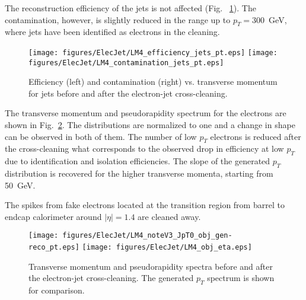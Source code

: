 \documentclass{cmspaper}
\begin{document}
The reconstruction efficiency of the jets is not affected (Fig.
~\ref{fig:effCont_Jets_ElecJet}). The contamination, however, is slightly reduced
in the range up to $p_T=300$~GeV, where jets have been identified as electrons in
the cleaning.
\begin{figure}[htb]
\begin{center}
    \texttt{[image: figures/ElecJet/LM4\_efficiency\_jets\_pt.eps]}
    \texttt{[image: figures/ElecJet/LM4\_contamination\_jets\_pt.eps]}
    \caption{Efficiency (left) and contamination (right) vs. transverse momentum
    for jets before and after the electron-jet cross-cleaning.}
\label{fig:effCont_Jets_ElecJet}
\end{center}
\end{figure}


The transverse momentum and pseudorapidity spectrum for the electrons are shown
in Fig.~\ref{fig:objSpectra_ElecJet}. The distributions are normalized to one
and a change in shape can be observed in both of them. The number of low $p_T$
electrons is reduced after the cross-cleaning what corresponds to the observed
drop in efficiency at low $p_T$ due to identification and isolation
efficiencies. The slope of the generated $p_T$ distribution is recovered for
the higher transverse momenta, starting from 50\ GeV.

The spikes from fake electrons located at the transition region from barrel to
endcap calorimeter around $|\eta|=1.4$ are cleaned away.

\begin{figure}[htb]
\begin{center}
    \texttt{[image: figures/ElecJet/LM4\_noteV3\_JpT0\_obj\_gen-reco\_pt.eps]}
    \texttt{[image: figures/ElecJet/LM4\_obj\_eta.eps]}
    \caption{Transverse momentum and pseudorapidity spectra before
    and after the electron-jet cross-cleaning. The generated $p_T$ spectrum is
    shown for comparison.}
\label{fig:objSpectra_ElecJet}
\end{center}
\end{figure}
\end{document}
